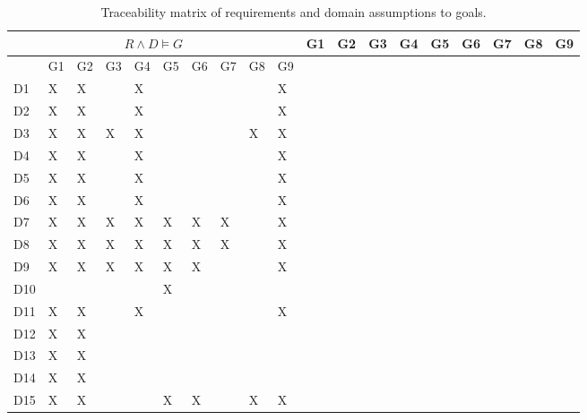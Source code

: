 \documentclass{article}
\begin{document}
\begin{longtable}[c]{|m{0.15cm}|m{0.15cm}|m{0.15cm}|m{0.15cm}|m{0.15cm}|m{0.15cm}|m{0.15cm}|m{0.15cm}|m{0.15cm}|m{0.15cm}|m{0.15cm}|}
 \caption{Traceability matrix of requirements and domain assumptions to goals.}
 \label{rg mapping}
 \hline
 \multicolumn{10}{|c|}{\cellcolor{white}$R \wedge D \vDash G$}
 \endfirsthead
 \hline
  \cellcolor{yellow!30} & \cellcolor{white}G1 & \cellcolor{white}G2 & \cellcolor{white}G3 & \cellcolor{white}G4 & \cellcolor{white}G5 & \cellcolor{white}G6 & \cellcolor{white}G7 & \cellcolor{white}G8 & \cellcolor{white}G9  \\
 \endhead
 \endfoot
 \endlastfoot
 \hline
  \cellcolor{yellow!30} & \cellcolor{white}G1 & \cellcolor{white}G2 & \cellcolor{white}G3 & \cellcolor{white}G4 & \cellcolor{white}G5 & \cellcolor{white}G6 & \cellcolor{white}G7 & \cellcolor{white}G8 & \cellcolor{white}G9  \\
 \hline
 D1 &X   &X   &   & X  &   &   &   &   &  X    \\
 \hline
 D2 &X   & X  &   &  X &   &   &   &   &  X    \\
 \hline
 D3 &X   &  X & X  &  X &   &   &   & X  &  X    \\
 \hline
 D4 &X   &   X&   & X  &    &   &   &   &  X    \\
 \hline
 D5 &X   & X  &   & X  &   &   &   &   &   X   \\
 \hline
 D6 &X   & X  &   & X  &   &   &   &   &  X    \\
 \hline
 D7 &X   & X  & X  & X  & X  & X  & X  &   &  X    \\
 \hline
 D8 &X   & X  & X  & X  & X  & X  & X  &   & X     \\
 \hline
 D9 &X   & X  & X  & X  & X  & X  &   &   &  X    \\
 \hline
 D10 &   &   &   &   & X  &   &   &   &     \\
 \hline
 D11 &X   & X  &   & X  &   &   &   &   & X     \\
 \hline
 D12 &X   & X  &   &   &   &   &   &   &      \\
 \hline
 D13 &X   & X  &   &   &   &   &   &   &      \\
 \hline
 D14 &X   & X  &   &   &   &   &   &   &      \\
 \hline
 D15 &X   & X  &   &   &X   & X  &   &  X & X     \\

\end{longtable}
\end{document}
